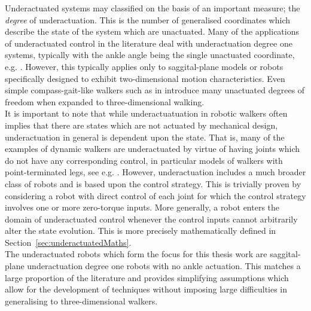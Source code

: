 Underactuated systems may classified on the basis of an important measure; the \textit{degree} of underactuation. This is the number of generalised coordinates which describe the state of the system which are unactuated. Many of the applications of underactuated control in the literature deal with underactuation degree one systems, typically with the ankle angle being the single unactuated coordinate, e.g. \cite{byl2008approximate, westervelt2003hybrid}. However, this typically applies only to saggital-plane models or robots specifically designed to exhibit two-dimensional motion characteristics. Even simple compass-gait-like walkers such as in \cite{tedrake2004actuating} introduce many unactuated degrees of freedom when expanded to three-dimensional walking. \\

It is important to note that while underactuatuation in robotic walkers often implies that there are states which are not actuated by mechanical design, underactuation in general is dependent upon the state. That is, many of the examples of dynamic walkers are underactuated by virtue of having joints which do not have any corresponding control, in particular models of walkers with point-terminated legs, see e.g. \cite{westervelt2003hybrid}. However, underactuation includes a much broader class of robots and is based upon the control strategy. This is trivially proven by considering a robot with direct control of each joint for which the control strategy involves one or more zero-torque inputs. More generally, a robot enters the domain of underactuated control whenever the control inputs cannot arbitrarily alter the state evolution. This is more precisely mathematically defined in Section~\ref{sec:underactuatedMaths}. \\

The underactuated robots which form the focus for this thesis work are saggital-plane underactuation degree one robots with no ankle actuation. This matches a large proportion of the literature and provides simplifying assumptions which allow for the development of techniques without imposing large difficulties in generalising to three-dimensional walkers.